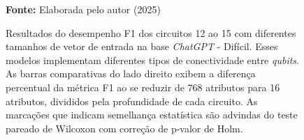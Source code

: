 \begin{figure}
\caption{Resultados do desempenho F1 dos circuitos 12 ao 15 com diferentes tamanhos de vetor de entrada na base \textit{ChatGPT} - Difícil. Esses modelos implementam diferentes tipos de conectividade entre \textit{qubits}. As barras comparativas do lado direito exibem a diferença percentual da métrica F1 ao se reduzir de 768 atributos para 16 atributos, divididos pela profundidade de cada circuito. As marcações que indicam semelhança estatística são advindas do teste pareado de Wilcoxon com correção de p-valor de Holm.}
\label{fig:n_features:hard:g3}
     \centering
    \centering
      \par\medskip\ABNTEXfontereduzida\selectfont\textbf{Fonte:} Elaborada pelo autor (2025) \par\medskip
\end{figure}